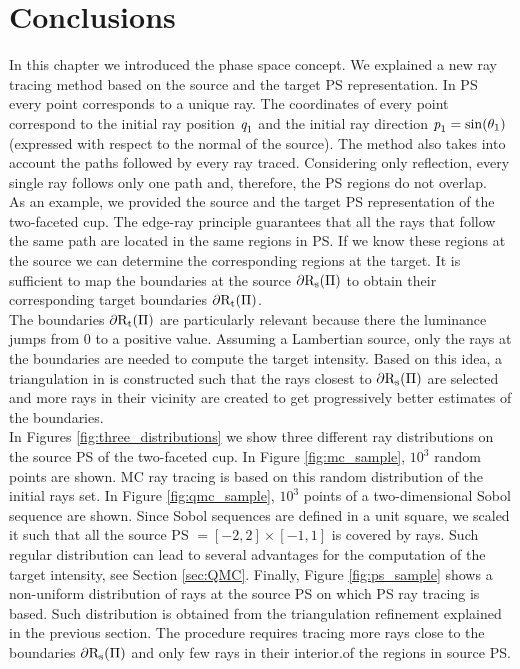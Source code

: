 \section{Conclusions}
In this chapter we introduced the phase space concept. 
We explained a new ray tracing method based on the source and the target PS representation. 
In PS every point corresponds to a unique ray. 
The coordinates of every point correspond to the initial ray position $\textit{q}_1$ and the initial ray direction $\textit{p}_1 = \sin(\theta_1)$ (expressed with respect to the normal of the source). The method also takes into account the paths followed by every ray traced.
Considering only reflection, every single ray follows only one path and, therefore, the PS regions do not overlap. 
\\ \indent
As an example, we provided the source and the target PS representation of the two-faceted cup.
The edge-ray principle guarantees that all the rays that follow the same path are located in the same regions in PS. If we know these regions at the source we can determine the corresponding regions at the target. 
It is sufficient to map the boundaries at the source $\partial\mbox{$\textup{R}$}_\textrm{s}(\Pi)$ to obtain their corresponding target boundaries $\partial\mbox{$\textup{R}$}_\textrm{t}(\Pi)$. \\ \indent
The boundaries $\partial\mbox{$\textup{R}$}_\textrm{t}(\Pi)$ are particularly relevant because there the luminance jumps from $0$ to a positive value. 
Assuming a Lambertian source, only the rays at the boundaries are needed to compute the target intensity. 
Based on this idea, a triangulation in  is constructed such that the rays closest to $\partial\mbox{$\textup{R}$}_\textrm{s}(\Pi)$
are selected and more rays in their vicinity are created to get progressively better estimates of the boundaries.
\\ \indent In Figures \ref{fig:three_distributions} we show three different ray distributions on the source PS of the two-faceted cup. In Figure \ref{fig:mc_sample}, $10^3$ random points are shown. MC ray tracing is based on this random distribution of the initial rays set. In Figure \ref{fig:qmc_sample}, $10^3$ points of a two-dimensional Sobol sequence are shown. 
Since Sobol sequences are defined in a unit square, we scaled it such that all the source PS $=[-2, 2]\times[-1, 1]$ is covered by rays. Such regular distribution can lead to several advantages for the computation of the target intensity, see Section \ref{sec:QMC}. Finally, Figure \ref{fig:ps_sample} shows a non-uniform distribution of rays at the source PS on which PS ray tracing is based. Such distribution is obtained from the triangulation refinement explained in the previous section. The procedure requires tracing more rays close to the boundaries $\partial\mbox{$\textup{R}$}_\textrm{s}(\Pi)$ and only few rays in their interior.of the regions in source PS. 
